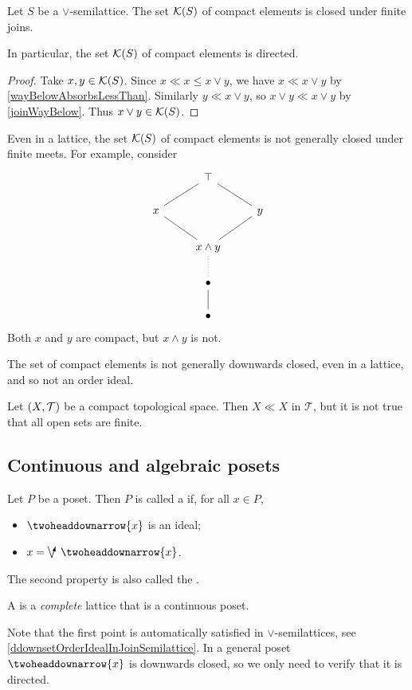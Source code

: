 \begin{proposition} \label{compactsDirected}
Let $S$ be a $\vee$-semilattice. The set $\operatorname{\mathcal{K}}(S)$ of compact elements is closed under finite joins.
\end{proposition}
In particular, the set $\operatorname{\mathcal{K}}(S)$ of compact elements is directed.
\begin{proof}
Take $x,y\in \operatorname{\mathcal{K}}(S)$. Since $x \ll x \leq x \vee y$, we have $x \ll x\vee y$ by \ref{wayBelowAbsorbsLessThan}. Similarly $y \ll x\vee y$, so $x\vee y \ll x\vee y$ by \ref{joinWayBelow}. Thus $x\vee y\in \operatorname{\mathcal{K}}(S)$.
\end{proof}

\begin{example}
Even in a lattice, the set $\operatorname{\mathcal{K}}(S)$ of compact elements is not generally closed under finite meets. For example, consider
\[ \begin{tikzcd}
& \top \ar[dl, dash] \ar[dr, dash] & \\
x \ar[dr, dash] & {} & y \ar[dl, dash] \\
{} & x\wedge y \ar[d, dash, dotted] & {} \\
{} & \bullet \ar[d, dash] & {} \\
{} & \bullet & {}
\end{tikzcd} \]
Both $x$ and $y$ are compact, but $x\wedge y$ is not.
\end{example}

\begin{example}
The set of compact elements is not generally downwards closed, even in a lattice, and so not an order ideal.

Let $\sSet{X,\mathcal{T}}$ be a compact topological space. Then $X \ll X$ in $\mathcal{T}$, but it is not true that all open sets are finite.
\end{example}

\subsection{Continuous and algebraic posets}
\begin{definition}
Let $P$ be a poset. Then $P$ is called a  if, for all $x\in P$,
\begin{itemize}
\item $\ddownset \{x\}$ is an ideal;
\item $x = \dirvee\; \ddownset \{x\}$.
\end{itemize}
The second property is also called the .

A  is a \emph{complete} lattice that is a continuous poset.
\end{definition}
Note that the first point is automatically satisfied in $\vee$-semilattices, see \ref{ddownsetOrderIdealInJoinSemilattice}. In a general poset $\ddownset \{x\}$ is downwards closed, so we only need to verify that it is directed.

